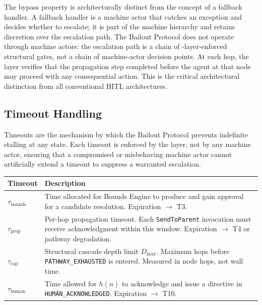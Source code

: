 The bypass property is architecturally distinct from the concept of a fallback handler. A fallback handler is a machine actor that catches an exception and decides whether to escalate; it is part of the machine hierarchy and retains discretion over the escalation path. The Bailout Protocol does not operate through machine actors: the escalation path is a chain of \fact{}-layer-enforced structural gates, not a chain of machine-actor decision points. At each hop, the \fact{} layer verifies that the propagation step completed before the agent at that node may proceed with any consequential action. This is the critical architectural distinction from all conventional HITL architectures.

\subsection{Timeout Handling}
\label{sec:bp-timeouts}

Timeouts are the mechanism by which the Bailout Protocol prevents indefinite stalling at any state. Each timeout is enforced by the \fact{} layer, not by any machine actor, ensuring that a compromised or misbehaving machine actor cannot artificially extend a timeout to suppress a warranted escalation.

\medskip
\noindent\begin{minipage}{\linewidth}
\label{tab:bp-timeouts}
\medskip
\noindent\begin{tabular}{lp{5.5cm}}
\toprule
\textbf{Timeout} & \textbf{Description} \\
\midrule
$\tau_{\text{bounds}}$ & Time allocated for Bounds Engine to produce and gain approval for a candidate resolution. Expiration $\rightarrow$ T3. \\
$\tau_{\text{prop}}$  & Per-hop propagation timeout. Each \texttt{SendToParent} invocation must receive acknowledgment within this window. Expiration $\rightarrow$ T4 or pathway degradation. \\
$\tau_{\text{cap}}$   & Structural cascade depth limit $D_{\max}$. Maximum hops before \texttt{PATHWAY\_EXHAUSTED} is entered. Measured in node hops, not wall time. \\
$\tau_{\text{human}}$ & Time allowed for $h(n)$ to acknowledge and issue a directive in \texttt{HUMAN\_ACKNOWLEDGED}. Expiration $\rightarrow$ T10. \\
\bottomrule
\end{tabular}
\end{minipage}

